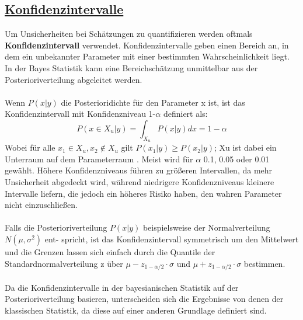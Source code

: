 \documentclass[a4paper,12pt]{article}
\begin{document}
\subsection*{\underline{Konfidenzintervalle}}
Um Unsicherheiten bei Schätzungen zu quantifizieren werden oftmals \textbf{Konfidenzintervall} verwendet. Konfidenzintervalle geben einen Bereich an, in dem ein unbekannter Parameter mit einer bestimmten Wahrscheinlichkeit liegt. In der Bayes Statistik kann eine Bereichschätzung unmittelbar aus der Posterioriverteilung abgeleitet werden. \parencite[71]{EinfBayesStatistik} \\\\
Wenn $P(x | y)$ die Posterioridichte für den Parameter x ist, ist das Konfidenzintervall mit Konfidenzniveau 1-$\alpha$ definiert als:
\begin{equation}
  P(x \in X_u|y) = \int_{X_u} P(x|y) dx = 1-\alpha
\end{equation}
Wobei für alle $x_1 \in X_u, x_2 \not\in X_u$ gilt $P(x_1|y) \geq P(x_2|y)$; Xu ist dabei ein Unterraum auf dem Parameterraum \parencite[71]{EinfBayesStatistik}. Meist wird für $\alpha$ 0.1, 0.05 oder 0.01 gewählt. Höhere Konfidenzniveaus führen zu größeren Intervallen, da mehr Unsicherheit abgedeckt wird, während niedrigere Konfidenzniveaus kleinere Intervalle liefern, die jedoch ein höheres Risiko haben, den wahren Parameter nicht einzuschließen. \\\\
Falls die Posterioriverteilung $P(x | y)$ beispielsweise der Normalverteilung $N(\mu,\sigma^2)$ ent- spricht, ist das Konfidenzintervall symmetrisch um den Mittelwert und die Grenzen lassen sich einfach durch die Quantile der Standardnormalverteilung z über $\mu - z_{1-\alpha/2} \cdot \sigma$ und $\mu + z_{1-\alpha/2} \cdot \sigma$ bestimmen.\\\\
Da die Konfidenzintervalle in der bayesianischen Statistik auf der Posterioriverteilung basieren, unterscheiden sich die Ergebnisse von denen der klassischen Statistik, da diese auf einer anderen Grundlage definiert sind.

\newpage
\end{document}
